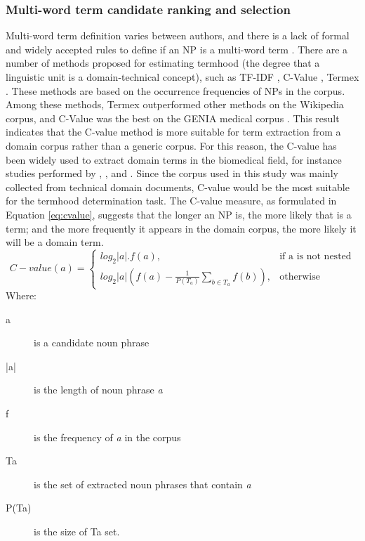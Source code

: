\documentclass[Journal, BackFigs,NoLists, DoubleSpace]{ascelike}%
\begin{document}
\subsubsection{Multi-word term candidate ranking and selection} 
%
Multi-word term definition varies between authors, and there is a lack of formal and widely accepted rules to define if an NP is a multi-word term \cite{frantzi20}. There are a number of methods proposed for estimating termhood (the degree that a linguistic unit is a domain-technical concept), such as TF-IDF \cite{sparck72,salton88}, C-Value \cite{frantzi20}, Termex  \cite{sclano07}. These methods are based on the occurrence frequencies of NPs in the corpus. Among these methods, Termex outperformed other methods on the Wikipedia corpus, and C-Value was the best on the GENIA medical corpus \cite{zhang08}. This result indicates that the C-value method is more suitable for term extraction from a domain corpus rather than a generic corpus. For this reason, the C-value has been widely used to extract domain terms in the biomedical field, for instance studies performed by , , and . Since the corpus used in this study was mainly collected from technical domain documents, C-value would be the most suitable for the termhood determination task. The C-value measure, as formulated in Equation \ref{eq:cvalue}, suggests that the longer an NP is, the more likely that is a term; and the more frequently it appears in the domain corpus, the more likely it will be a domain term.
	\begin{equation}
	C-value(a)=
	\begin{cases}
	log_2|a|.f(a), & \text{if a is not nested} \\
	log_2|a|(f(a)-\frac{1}{P(T_a)}\sum_{b\in T_a} f(b)), & \text{otherwise}
	\end{cases}
	\label{eq:cvalue}
	\end{equation}
	Where:
	\begin{description}
		\item[a] is a candidate noun phrase
		\item[|a|] is the length of noun phrase \textit{a}
		\item[f] is the frequency of \textit{a} in the corpus
		\item[Ta] is the set of extracted noun phrases that contain \textit{a}
		\item[P(Ta)] is the size of Ta set.
	\end{description}
\end{document}
